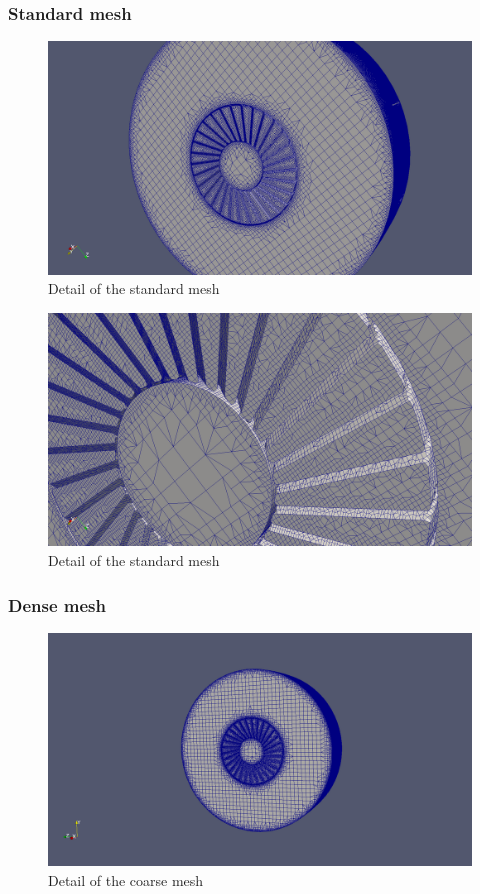 \subsubsection{Standard mesh}

\begin{figure}[h!]
\includegraphics[scale=0.26]{./mesh/screenshots/std2}
\centering
\caption{Detail of the standard mesh}
\end{figure}

\begin{figure}[h!]
\includegraphics[scale=0.26]{./mesh/screenshots/std3}
\centering
\caption{Detail of the standard mesh}
\end{figure}

\subsubsection{Dense mesh}

\begin{figure}[h!]
\includegraphics[scale=0.26]{./mesh/screenshots/Xtreme1}
\centering
\caption{Detail of the coarse mesh}
\end{figure}

